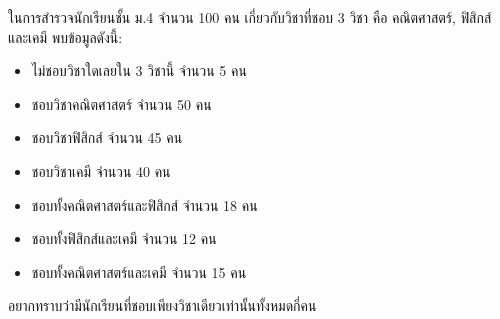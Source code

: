 ﻿%
\question ในการสำรวจนักเรียนชั้น ม.4 จำนวน 100 คน เกี่ยวกับวิชาที่ชอบ 3 วิชา คือ คณิตศาสตร์, ฟิสิกส์ และเคมี พบข้อมูลดังนี้:
\begin{itemize}
    \item ไม่ชอบวิชาใดเลยใน 3 วิชานี้ จำนวน 5 คน
    \item ชอบวิชาคณิตศาสตร์ จำนวน 50 คน
    \item ชอบวิชาฟิสิกส์ จำนวน 45 คน
    \item ชอบวิชาเคมี จำนวน 40 คน
    \item ชอบทั้งคณิตศาสตร์และฟิสิกส์ จำนวน 18 คน
    \item ชอบทั้งฟิสิกส์และเคมี จำนวน 12 คน
    \item ชอบทั้งคณิตศาสตร์และเคมี จำนวน 15 คน
\end{itemize}
อยากทราบว่ามีนักเรียนที่ชอบเพียงวิชาเดียวเท่านั้นทั้งหมดกี่คน
\newline 
{}
